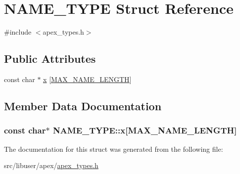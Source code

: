 \hypertarget{structNAME__TYPE}{}\section{N\+A\+M\+E\+\_\+\+T\+Y\+PE Struct Reference}
\label{structNAME__TYPE}


{\ttfamily \#include $<$apex\+\_\+types.\+h$>$}

\subsection*{Public Attributes}
\begin{DoxyCompactItemize}
\item 
const char $\ast$ \hyperlink{structNAME__TYPE_ac5677dd8b326510aa1b29a3b43c0ead6}{x} \mbox{[}\hyperlink{apex__types_8h_ac74d8fef3c389eb3db8dd1681031d7bf}{M\+A\+X\+\_\+\+N\+A\+M\+E\+\_\+\+L\+E\+N\+G\+TH}\mbox{]}
\end{DoxyCompactItemize}


\subsection{Member Data Documentation}
\subsubsection[{\texorpdfstring{x}{x}}]{\setlength{\rightskip}{0pt plus 5cm}const char$\ast$ N\+A\+M\+E\+\_\+\+T\+Y\+P\+E\+::x\mbox{[}{\bf M\+A\+X\+\_\+\+N\+A\+M\+E\+\_\+\+L\+E\+N\+G\+TH}\mbox{]}}\hypertarget{structNAME__TYPE_ac5677dd8b326510aa1b29a3b43c0ead6}{}\label{structNAME__TYPE_ac5677dd8b326510aa1b29a3b43c0ead6}


The documentation for this struct was generated from the following file\+:\begin{DoxyCompactItemize}
\item 
src/libuser/apex/\hyperlink{apex__types_8h}{apex\+\_\+types.\+h}\end{DoxyCompactItemize}
